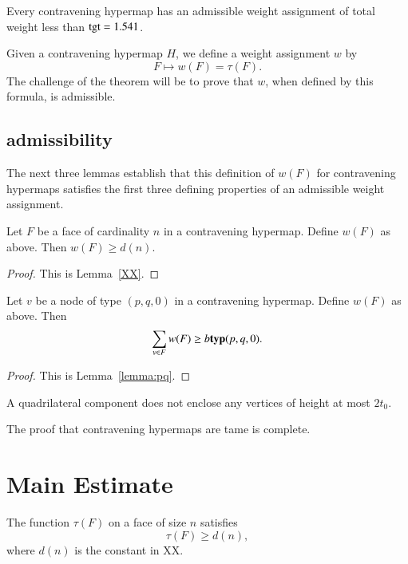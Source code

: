 \begin{theorem}  Every contravening hypermap has an admissible
weight assignment of total weight less than ${\operatorname{tgt}}=1.541$.
\end{theorem}

Given a contravening hypermap $H$, we
define a weight assignment $w$ by
    $$F \mapsto w(F) = \tau(F).$$
The challenge of the theorem will be to prove that $w$, when
defined by this formula, is admissible.

\subsection{admissibility}
\label{sec:admissibility}

The next three lemmas establish that this definition of $w(F)$ for contravening hypermaps satisfies the first three defining
properties of an admissible weight assignment.

\begin{lemma}  Let $F$ be a face of cardinality $n$ in a contravening hypermap.
Define $w(F)$ as above. Then
        $w(F) \ge d(n)$.
\end{lemma}

\begin{proof} This is Lemma~\ref{XX}. %
\end{proof}

\begin{lemma} Let $v$ be a node of type $(p,q,0)$ in a contravening hypermap.  Define $w(F)$ as above. Then
        $$\sum_{v\in F} w(F) \ge b{{\operatorname{\bf typ}}{(p,q,0)}}.$$
\end{lemma}


\begin{proof} This is Lemma~\ref{lemma:pq}.
\end{proof}

\begin{lemma}\label{lemma:enclosed:bis} %
A quadrilateral component does not enclose any vertices of height at
most $2t_0$.
\end{lemma}

The proof that contravening hypermaps are tame is complete.


\section{Main Estimate}


\begin{lemma}  The function $\tau(F)$ on a face of
size $n$ satisfies 
$$
\tau(F) \ge d(n),
$$
where $d(n)$ is the constant in XX.
\end{lemma}

